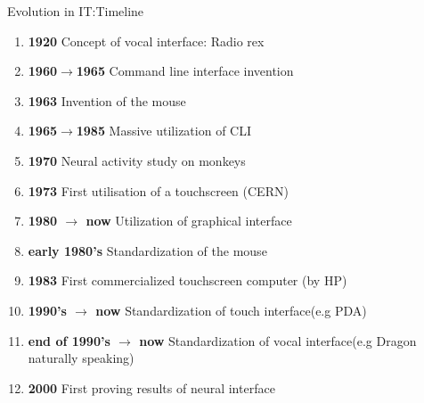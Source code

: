 \documentclass{beamer}
\begin{document}
\begin{frame}{Evolution in IT:Timeline}

\begin{enumerate}
\item \textbf{1920} Concept of vocal interface: Radio rex
\item \textbf{1960$\rightarrow$1965} Command line interface invention
\item \textbf{1963} Invention of the mouse
\item \textbf{1965$\rightarrow$1985} Massive utilization of CLI
\item \textbf{1970} Neural activity study on monkeys
\item \textbf{1973} First utilisation of a touchscreen (CERN)
\item \textbf{1980 $\rightarrow$ now} Utilization of graphical interface
\item \textbf{early 1980's} Standardization of the mouse
\item \textbf{1983} First commercialized touchscreen computer (by HP)
\item \textbf{1990's $\rightarrow$ now} Standardization of touch interface(e.g PDA)
\item \textbf{end of 1990's $\rightarrow$ now} Standardization of vocal interface(e.g Dragon naturally speaking)
\item \textbf{2000} First proving results of neural interface
\end{enumerate}
\end{frame}
\end{document}

